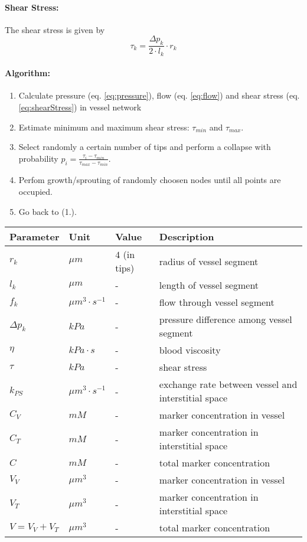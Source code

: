 \documentclass{article}
\begin{document}
\paragraph{Shear Stress:}
The shear stress is given by 
\begin{equation}
	\tau_k = \frac{\Delta p_k}{2 \cdot l_k} \cdot r_k\label{eq:shearStress}
\end{equation}


\paragraph{Algorithm:}
\begin{enumerate}
 \item Calculate pressure (eq. \ref{eq:pressure}), flow (eq. \ref{eq:flow}) and shear stress (eq. \ref{eq:shearStress}) in vessel network
 \item Estimate minimum and maximum shear stress: $\tau_{min}$ and $\tau_{max}$.
 \item Select randomly a certain number of tips and perform a collapse with probability $p_i = \frac{\tau_{i}-\tau_{min}}{\tau_{max}-\tau_{min}}$. 
 \item Perfom growth/sprouting of randomly choosen nodes until all points are occupied.
 \item Go back to (1.). 
\end{enumerate}

\begin{tabular}{l|l|l|l}
	Parameter	& Unit	&Value	&Description \\ \hline
	$r_k$		& $\mu m$	& $4$ (in tips) & radius of vessel segment \\
	$l_k$		& $\mu m$	& - 		& length of vessel segment \\
	$f_k$		& $\mu m^3 \cdot s^{-1}$	& -	& flow through vessel segment \\
	$\Delta p_k$	& $kPa$		& - 		& pressure difference among vessel segment \\
	$\eta$		& $kPa \cdot s$	& -		& blood viscosity \\
	$\tau$		& $kPa$		& -		& shear stress \\
	$k_{PS}$	& $\mu m^3 \cdot s^{-1}$& -	& exchange rate between vessel and interstitial space \\
	$C_V$		& $mM$	& -		& marker concentration in vessel \\
	$C_T$		& $mM$	& -		& marker concentration in interstitial space \\
	$C$		& $mM$	& -		& total marker concentration \\
	$V_V$		& $\mu m^3$	& -		& marker concentration in vessel \\
	$V_T$		& $\mu m^3$	& -		& marker concentration in interstitial space \\
	$V = V_V+V_T$	& $\mu m^3$	& -		& total marker concentration \\
\end{tabular}
\end{document}
